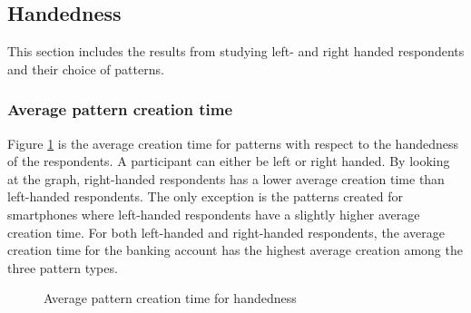 	\subsection{Handedness}\label{sec:subgroupHandedness}
		This section includes the results from studying left- and right handed respondents and their choice of patterns.

    \subsubsection{Average pattern creation time}
    Figure \ref{fig:avgcreationtimehandedness} is the average creation time for patterns with respect to the handedness of the respondents. A participant can either be left or right handed. By looking at the graph, right-handed respondents has a lower average creation time than left-handed respondents. The only exception is the patterns created for smartphones where left-handed respondents have a slightly higher average creation time. For both left-handed and right-handed respondents, the average creation time for the banking account has the highest average creation among the three pattern types.  

      \begin{figure}[H]
        \centering
        \caption{Average pattern creation time for handedness}
        \label{fig:avgcreationtimehandedness}
      \end{figure}


